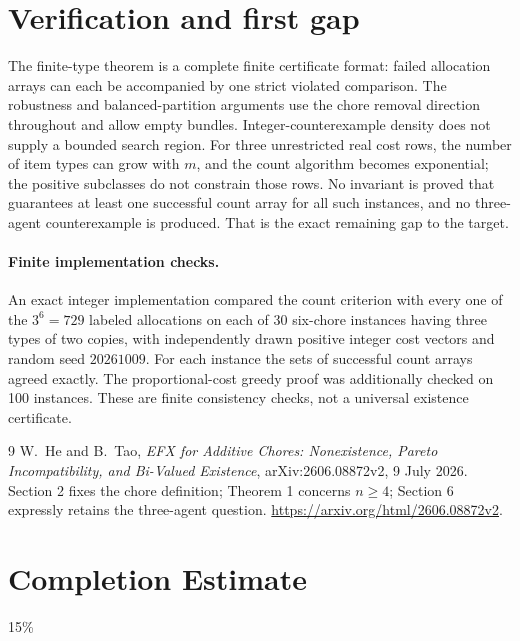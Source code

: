 \documentclass[11pt]{article}
\theoremstyle{definition}
\begin{document}
\section{Verification and first gap}
The finite-type theorem is a complete finite certificate format: failed
allocation arrays can each be accompanied by one strict violated comparison.
The robustness and balanced-partition arguments use the chore removal direction
throughout and allow empty bundles. Integer-counterexample density does not
supply a bounded search region. For three unrestricted real cost rows, the
number of item types can grow with $m$, and the count algorithm becomes
exponential; the positive subclasses do not constrain those rows. No invariant
is proved that guarantees at least one successful count array for all such
instances, and no three-agent counterexample is produced. That is the exact
remaining gap to the target.

\paragraph{Finite implementation checks.}
An exact integer implementation compared the count criterion with every
one of the $3^6=729$ labeled allocations on each of 30 six-chore instances
having three types of two copies, with independently drawn positive integer
cost vectors and random seed $20261009$. For each instance the sets of
successful count arrays agreed exactly. The proportional-cost greedy proof
was additionally checked on 100 instances. These are finite consistency
checks, not a universal existence certificate.

\begin{thebibliography}{9}
 W.~He and B.~Tao, \emph{EFX for Additive Chores: Nonexistence,
Pareto Incompatibility, and Bi-Valued Existence}, arXiv:2606.08872v2,
9 July 2026. Section 2 fixes the chore definition; Theorem 1 concerns
$n\geq4$; Section 6 expressly retains the three-agent question.
\url{https://arxiv.org/html/2606.08872v2}.
\end{thebibliography}

\section{Completion Estimate}
15\%
\end{document}
